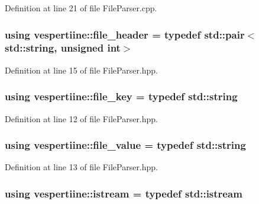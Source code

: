 Definition at line 21 of file File\+Parser.\+cpp.

\subsubsection[{\texorpdfstring{file\+\_\+header}{file_header}}]{\setlength{\rightskip}{0pt plus 5cm}using {\bf vespertiine\+::file\+\_\+header} = typedef std\+::pair$<$std\+::string, unsigned int$>$}\hypertarget{group__vespertiine_ga1294ff353dd9ea9b26cf4a1573db109e}{}\label{group__vespertiine_ga1294ff353dd9ea9b26cf4a1573db109e}


Definition at line 15 of file File\+Parser.\+hpp.

\subsubsection[{\texorpdfstring{file\+\_\+key}{file_key}}]{\setlength{\rightskip}{0pt plus 5cm}using {\bf vespertiine\+::file\+\_\+key} = typedef std\+::string}\hypertarget{group__vespertiine_ga39a811996b190f9e1ffa0663d4f5744a}{}\label{group__vespertiine_ga39a811996b190f9e1ffa0663d4f5744a}


Definition at line 12 of file File\+Parser.\+hpp.

\subsubsection[{\texorpdfstring{file\+\_\+value}{file_value}}]{\setlength{\rightskip}{0pt plus 5cm}using {\bf vespertiine\+::file\+\_\+value} = typedef std\+::string}\hypertarget{group__vespertiine_ga546be9d1b39ff78c5bf63e598bc51a0a}{}\label{group__vespertiine_ga546be9d1b39ff78c5bf63e598bc51a0a}


Definition at line 13 of file File\+Parser.\+hpp.

\subsubsection[{\texorpdfstring{istream}{istream}}]{\setlength{\rightskip}{0pt plus 5cm}using {\bf vespertiine\+::istream} = typedef std\+::istream}\hypertarget{group__vespertiine_ga338498d8eeb1f5a3da1f237df24c4250}{}\label{group__vespertiine_ga338498d8eeb1f5a3da1f237df24c4250}


